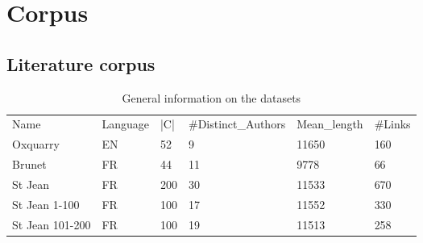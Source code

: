 \section{Corpus}

\subsection{Literature corpus}



\begin{table*}[t]
  \caption{General information on the datasets}
  \label{tab:datasets}
  \begin{tabular}{|l|l|l|l|l|l|}
    Name & Language & |C| & \#Distinct\_Authors & Mean\_length & \#Links \\
    Oxquarry & EN & 52 & 9 & 11650 & 160 \\
    Brunet & FR & 44 & 11 & 9778 & 66 \\
    St Jean & FR & 200 & 30 & 11533 & 670 \\
    St Jean 1-100 & FR & 100 & 17 & 11552 & 330 \\
    St Jean 101-200 & FR & 100 & 19 & 11513 & 258 \\
  \end{tabular}
\end{table*}



\subsection{}
